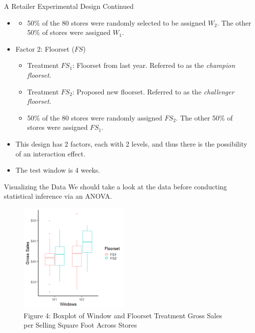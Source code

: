 \documentclass[pdf]{beamer}
\theoremstyle{remark}
\theoremstyle{definition}
\begin{document}
\begin{frame}[t]{A Retailer Experimental Design Continued}
\begin{itemize}
 \item []
 \small
 \begin{itemize}
  \item   50\% of the 80 stores were randomly selected to be assigned $W_2$.  The other 50\% of stores were assigned $W_1$.
 \end{itemize}
 \normalsize
 \item Factor 2:  Floorset ($FS$)
 \small
  \begin{itemize}
  \item Treatment $FS_1$:  Floorset from last year.  Referred to as the \textit{champion floorset}.
  \item Treatment $FS_2$:  Proposed new floorset.  Referred to as the \textit{challenger floorset}.
  \item 
  50\% of the 80 stores were randomly assigned $FS_2$.  The other 50\% of stores were assigned $FS_1$. 
\end{itemize}
\normalsize
\item This design has 2 factors, each with 2 levels, and thus there is the possibility of an interaction effect.
\item The test window is 4 weeks. 
\end{itemize}
\end{frame}

\begin{frame}[t]{Visualizing the Data}
We should take a look at the data before conducting statistical inference via an ANOVA. \\
\vspace{1.5ex}
\begin{figure}[htbp]
  \captionsetup{justification=centering}
  \includegraphics[height=5.4cm, trim=0.0cm 0.0cm 0.0cm 0.0cm width=5.4cm]{Images/Summary_stats.png}
  \caption{Figure {\color{franklinblue} 4}: Boxplot of Window and Floorset Treatment Gross Sales per Selling Square Foot Across Stores}
\end{figure}
\end{frame}
\end{document}
